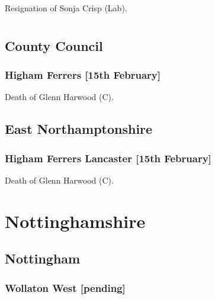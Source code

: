 \documentclass[a4paper,openany]{book}
\begin{document}
\begin{resultsiii}

Resignation of Sonja Crisp (Lab).

\section[Northamptonshire]{}

\subsection*{County Council}

\subsubsection*{Higham Ferrers \hspace*{\fill}\nolinebreak[1]%
\enspace\hspace*{\fill}
[15th February]}


Death of Glenn Harwood (C).

\subsection*{East Northamptonshire}

\subsubsection*{Higham Ferrers Lancaster \hspace*{\fill}\nolinebreak[1]%
\enspace\hspace*{\fill}
[15th February]}


Death of Glenn Harwood (C).

\section{Nottinghamshire}

\subsection*{Nottingham}

\subsubsection*{Wollaton West \hspace*{\fill}\nolinebreak[1]%
\enspace\hspace*{\fill}
[pending]}


\end{resultsiii}
\end{document}
